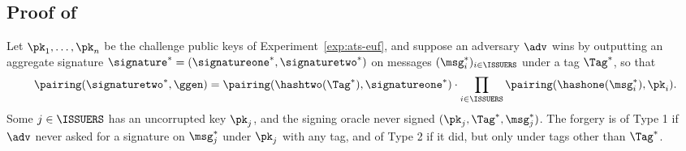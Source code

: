 
\subsection{Proof of }\label{sec:agg-creds-proof-2}

Let $\pk_1, \ldots, \pk_n$ be the challenge public keys of
Experiment~\ref{exp:ats-euf}, and suppose an adversary $\adv$ wins by outputting
an aggregate signature $\signature^* = (\signatureone^*, \signaturetwo^*)$ on
messages $(\msg_i^*)_{i \in \ISSUERS}$ under a tag $\Tag^*$, so that
%
\begin{equation*}
  \pairing(\signaturetwo^*,\ggen) = \pairing(\hashtwo(\Tag^*), \signatureone^*)\cdot
\prod_{i \in \ISSUERS} \pairing(\hashone(\msg_i^*), \pk_i).
\end{equation*}
%
Some $j \in \ISSUERS$ has an uncorrupted key $\pk_j$, and the signing oracle
never signed $(\pk_j, \Tag^*, \msg_j^*)$. The forgery is of Type 1 if $\adv$ never
asked for a signature on $\msg_j^*$ under $\pk_j$ with any tag, and of Type 2 if
it did, but only under tags other than $\Tag^*$.

